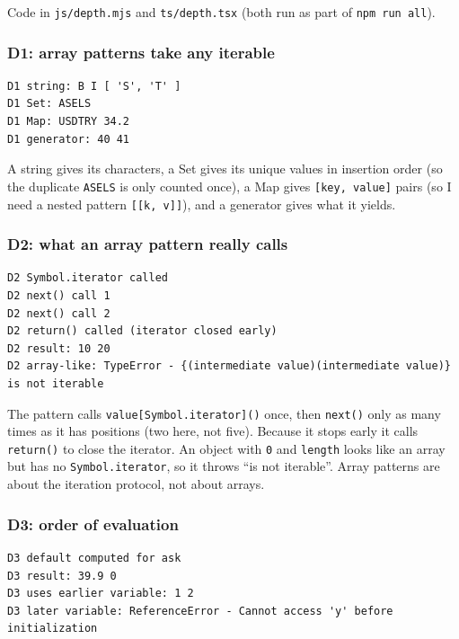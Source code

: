 \documentclass[
  11pt,
]{article}
\newcommand{\passthrough}[1]{#1}
\begin{document}
Code in \passthrough{\lstinline!js/depth.mjs!} and
\passthrough{\lstinline!ts/depth.tsx!} (both run as part of
\passthrough{\lstinline!npm run all!}).

\subsubsection{D1: array patterns take any
iterable}\label{d1-array-patterns-take-any-iterable}

\begin{lstlisting}
D1 string: B I [ 'S', 'T' ]
D1 Set: ASELS
D1 Map: USDTRY 34.2
D1 generator: 40 41
\end{lstlisting}

A string gives its characters, a Set gives its unique values in
insertion order (so the duplicate \passthrough{\lstinline!ASELS!} is
only counted once), a Map gives \passthrough{\lstinline![key, value]!}
pairs (so I need a nested pattern \passthrough{\lstinline![[k, v]]!}),
and a generator gives what it yields.

\subsubsection{D2: what an array pattern really
calls}\label{d2-what-an-array-pattern-really-calls}

\begin{lstlisting}
D2 Symbol.iterator called
D2 next() call 1
D2 next() call 2
D2 return() called (iterator closed early)
D2 result: 10 20
D2 array-like: TypeError - {(intermediate value)(intermediate value)} is not iterable
\end{lstlisting}

The pattern calls \passthrough{\lstinline!value[Symbol.iterator]()!}
once, then \passthrough{\lstinline!next()!} only as many times as it has
positions (two here, not five). Because it stops early it calls
\passthrough{\lstinline!return()!} to close the iterator. An object with
\passthrough{\lstinline!0!} and \passthrough{\lstinline!length!} looks
like an array but has no \passthrough{\lstinline!Symbol.iterator!}, so
it throws ``is not iterable''. Array patterns are about the iteration
protocol, not about arrays.

\subsubsection{D3: order of evaluation}\label{d3-order-of-evaluation}

\begin{lstlisting}
D3 default computed for ask
D3 result: 39.9 0
D3 uses earlier variable: 1 2
D3 later variable: ReferenceError - Cannot access 'y' before initialization
\end{lstlisting}
\end{document}
